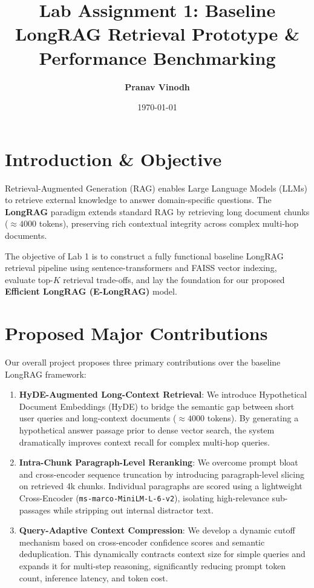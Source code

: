 \documentclass[11pt]{article}
\title{\textbf{Lab Assignment 1: Baseline LongRAG Retrieval Prototype \& Performance Benchmarking}}
\author{\textbf{Pranav Vinodh}}
\date{\today}
\begin{document}
\maketitle

\section{Introduction \& Objective}
Retrieval-Augmented Generation (RAG) enables Large Language Models (LLMs) to retrieve external knowledge to answer domain-specific questions. The \textbf{LongRAG} paradigm extends standard RAG by retrieving long document chunks ($\approx 4000$ tokens), preserving rich contextual integrity across complex multi-hop documents.

The objective of Lab 1 is to construct a fully functional baseline LongRAG retrieval pipeline using sentence-transformers and FAISS vector indexing, evaluate top-$K$ retrieval trade-offs, and lay the foundation for our proposed \textbf{Efficient LongRAG (E-LongRAG)} model.

\section{Proposed Major Contributions}
Our overall project proposes three primary contributions over the baseline LongRAG framework:

\begin{enumerate}
    \item \textbf{HyDE-Augmented Long-Context Retrieval}: We introduce Hypothetical Document Embeddings (HyDE) to bridge the semantic gap between short user queries and long-context documents ($\approx 4000$ tokens). By generating a hypothetical answer passage prior to dense vector search, the system dramatically improves context recall for complex multi-hop queries.
    
    \item \textbf{Intra-Chunk Paragraph-Level Reranking}: We overcome prompt bloat and cross-encoder sequence truncation by introducing paragraph-level slicing on retrieved 4k chunks. Individual paragraphs are scored using a lightweight Cross-Encoder (\texttt{ms-marco-MiniLM-L-6-v2}), isolating high-relevance sub-passages while stripping out internal distractor text.
    
    \item \textbf{Query-Adaptive Context Compression}: We develop a dynamic cutoff mechanism based on cross-encoder confidence scores and semantic deduplication. This dynamically contracts context size for simple queries and expands it for multi-step reasoning, significantly reducing prompt token count, inference latency, and token cost.
\end{enumerate}
\end{document}
